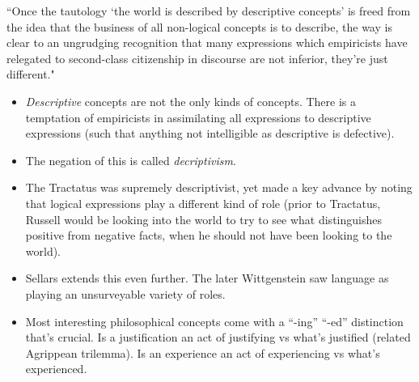 ``Once the tautology `the world is described by descriptive concepts' is freed
from the idea that the business of all non-logical concepts is to describe, the
 way is clear to an ungrudging recognition that many expressions which
 empiricists have relegated to second-class citizenship in discourse are not
 inferior, they're just different."

\begin{itemize}
    \item \emph{Descriptive} concepts are not the only kinds of concepts. There
         is a temptation of empiricists in assimilating all expressions to
         descriptive expressions (such that anything not intelligible as
         descriptive is defective).
    \item The negation of this is called \emph{decriptivism}.
    \item The Tractatus was supremely descriptivist, yet made a key advance by
        noting that logical expressions play a different kind of role (prior to
        Tractatus, Russell would be looking into the world to try to see what
        distinguishes positive from negative facts, when he should not have
        been looking to the world).
    \item Sellars extends this even further. The later Wittgenstein saw
        language as playing an unsurveyable variety of roles.
    \item Most interesting philosophical concepts come with a ``-ing'' ``-ed''
        distinction that's crucial. Is a justification an act of justifying vs
        what's justified (related Agrippean trilemma). Is an experience an act
        of experiencing vs what's experienced.
\end{itemize}